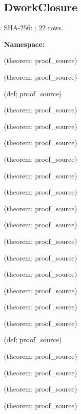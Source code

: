 \subsection*{DworkClosure}
{\footnotesize SHA-256: ; 22 rows.}\par
\begingroup\small
\textbf{Namespace:} \par
\noindent{} {\scriptsize (theorem; proof\_source)}\par
\noindent{} {\scriptsize (theorem; proof\_source)}\par
\noindent{} {\scriptsize (def; proof\_source)}\par
\noindent{} {\scriptsize (theorem; proof\_source)}\par
\noindent{} {\scriptsize (theorem; proof\_source)}\par
\noindent{} {\scriptsize (theorem; proof\_source)}\par
\noindent{} {\scriptsize (theorem; proof\_source)}\par
\noindent{} {\scriptsize (theorem; proof\_source)}\par
\noindent{} {\scriptsize (theorem; proof\_source)}\par
\noindent{} {\scriptsize (theorem; proof\_source)}\par
\noindent{} {\scriptsize (theorem; proof\_source)}\par
\noindent{} {\scriptsize (theorem; proof\_source)}\par
\noindent{} {\scriptsize (theorem; proof\_source)}\par
\noindent{} {\scriptsize (theorem; proof\_source)}\par
\noindent{} {\scriptsize (theorem; proof\_source)}\par
\noindent{} {\scriptsize (theorem; proof\_source)}\par
\noindent{} {\scriptsize (theorem; proof\_source)}\par
\noindent{} {\scriptsize (def; proof\_source)}\par
\noindent{} {\scriptsize (theorem; proof\_source)}\par
\noindent{} {\scriptsize (theorem; proof\_source)}\par
\noindent{} {\scriptsize (theorem; proof\_source)}\par
\noindent{} {\scriptsize (theorem; proof\_source)}\par
\endgroup

